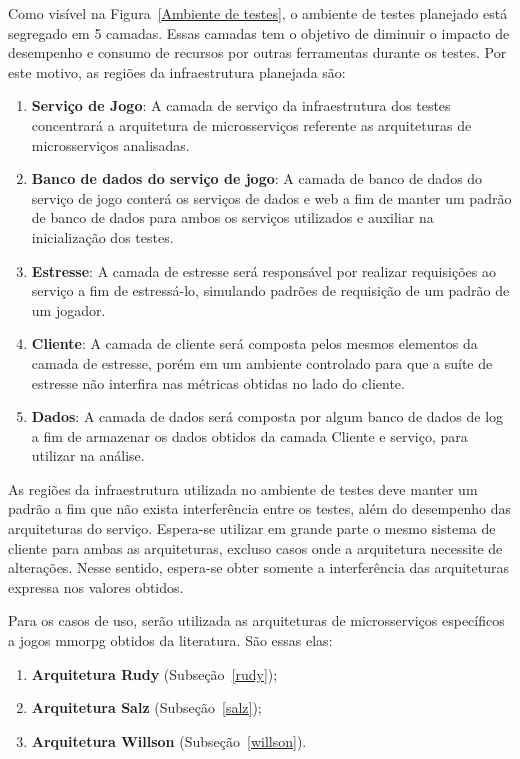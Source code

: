Como visível na Figura~\ref{Ambiente de testes}, o ambiente de testes planejado está segregado em 5 camadas.
%
Essas camadas tem o objetivo de diminuir o impacto de desempenho e consumo de recursos por outras ferramentas durante os testes.
%
Por este motivo, as regiões da infraestrutura planejada são:



\begin{enumerate}
  \item \textbf{Serviço de Jogo}: A camada de serviço da infraestrutura dos testes concentrará a arquitetura de microsserviços referente as arquiteturas de microsserviços analisadas.
  \item \textbf{Banco de dados do serviço de jogo}: A camada de banco de dados do serviço de jogo conterá os serviços de dados e web a fim de manter um padrão de banco de dados para ambos os serviços utilizados e auxiliar na inicialização dos testes.
  \item \textbf{Estresse}: A camada de estresse será responsável por realizar requisições ao serviço a fim de estressá-lo, simulando padrões de requisição de um padrão de um jogador.
  \item \textbf{Cliente}: A camada de cliente será composta pelos mesmos elementos da camada de estresse, porém em um ambiente controlado para que a suíte de estresse não interfira nas métricas obtidas no lado do cliente.
  \item \textbf{Dados}: A camada de dados será composta por algum banco de dados de log a fim de armazenar os dados obtidos da camada Cliente e serviço, para utilizar na análise.
\end{enumerate}



As regiões da infraestrutura utilizada no ambiente de testes deve manter um padrão a fim que não exista interferência entre os testes, além do desempenho das arquiteturas do serviço.
%
Espera-se utilizar em grande parte o mesmo sistema de cliente para ambas as arquiteturas, excluso casos onde a arquitetura necessite de alterações.
%
Nesse sentido, espera-se obter somente a interferência das arquiteturas expressa nos valores obtidos.



Para os casos de uso, serão utilizada as arquiteturas de microsserviços específicos a jogos \ac{mmorpg} obtidos da literatura.
%
São essas elas:



\begin{enumerate}
  \item \textbf{Arquitetura Rudy} (Subseção~\ref{rudy});
  \item \textbf{Arquitetura Salz} (Subseção~\ref{salz});
  \item \textbf{Arquitetura Willson} (Subseção~\ref{willson}).
\end{enumerate}



